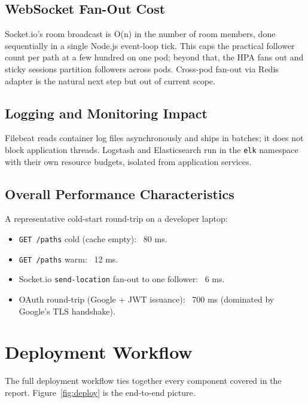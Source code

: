 \documentclass[11pt,a4paper]{article}
\begin{document}
\subsection{WebSocket Fan-Out Cost}
Socket.io's room broadcast is O(n) in the number of room members,
done sequentially in a single Node.js event-loop tick.  This caps
the practical follower count per path at a few hundred on one pod;
beyond that, the HPA fans out and sticky sessions partition
followers across pods.  Cross-pod fan-out via Redis adapter is the
natural next step but out of current scope.

\subsection{Logging and Monitoring Impact}
Filebeat reads container log files asynchronously and ships in
batches; it does not block application threads.  Logstash and
Elasticsearch run in the \texttt{elk} namespace with their own
resource budgets, isolated from application services.

\subsection{Overall Performance Characteristics}
A representative cold-start round-trip on a developer laptop:

\begin{itemize}[leftmargin=*]
  \item \texttt{GET /paths} cold (cache empty): ~80 ms.
  \item \texttt{GET /paths} warm: ~12 ms.
  \item Socket.io \texttt{send-location} fan-out to one follower:
        ~6 ms.
  \item OAuth round-trip (Google + JWT issuance): ~700 ms (dominated
        by Google's TLS handshake).
\end{itemize}

\section{Deployment Workflow}

The full deployment workflow ties together every component covered
in the report.  Figure~\ref{fig:deploy} is the end-to-end picture.
\end{document}
